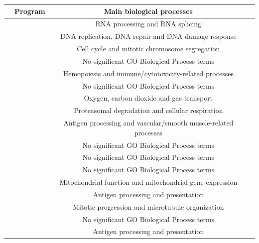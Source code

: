 \documentclass[11pt,a4paper]{article}
\newcommand{\enrichedbox}{%
	\makebox[0.65cm][l]{\textcolor{darkishgreen}{\rule{0.18cm}{0.18cm}}}%
}
\newcommand{\notenrichedbox}{%
	\makebox[0.65cm][l]{\textcolor{darkishred}{\rule{0.18cm}{0.18cm}}}%
}
\begin{document}
\begin{table}[htbp]
	\centering
	\renewcommand{\arraystretch}{1.25}
	\setlength{\tabcolsep}{6pt}
\begin{tabular*}{\linewidth}{@{\extracolsep{\fill}} cccl }
		\hline
		& \textbf{Program} & \textbf{Main biological processes} & \\
		\hline
		& \enrichedbox\makebox[0.3cm][r]{1}  & RNA processing and RNA splicing & \\
		& \enrichedbox\makebox[0.3cm][r]{2}  & DNA replication, DNA repair and DNA damage response & \\
		& \enrichedbox\makebox[0.3cm][r]{3}  & Cell cycle and mitotic chromosome segregation & \\
		& \notenrichedbox\makebox[0.3cm][r]{4}  & No significant GO Biological Process terms & \\
		& \enrichedbox\makebox[0.3cm][r]{5}  & Hemopoiesis and immune/cytotoxicity-related processes & \\
		& \notenrichedbox\makebox[0.3cm][r]{6}  & No significant GO Biological Process terms & \\
		& \enrichedbox\makebox[0.3cm][r]{7}  & Oxygen, carbon dioxide and gas transport & \\
		& \enrichedbox\makebox[0.3cm][r]{8}  & Proteasomal degradation and cellular respiration & \\
		& \enrichedbox\makebox[0.3cm][r]{9}  & Antigen processing and vascular/smooth muscle-related processes & \\
		& \notenrichedbox\makebox[0.3cm][r]{10} & No significant GO Biological Process terms & \\
		& \notenrichedbox\makebox[0.3cm][r]{11} & No significant GO Biological Process terms & \\
		& \notenrichedbox\makebox[0.3cm][r]{12} & No significant GO Biological Process terms & \\
		& \enrichedbox\makebox[0.3cm][r]{13} & Mitochondrial function and mitochondrial gene expression & \\
		& \enrichedbox\makebox[0.3cm][r]{14} & Antigen processing and presentation & \\
		& \enrichedbox\makebox[0.3cm][r]{15} & Mitotic progression and microtubule organization & \\
		& \notenrichedbox\makebox[0.3cm][r]{16} & No significant GO Biological Process terms & \\
		& \enrichedbox\makebox[0.3cm][r]{17} & Antigen processing and presentation & \\

\end{tabular*}
\end{table}
\end{document}
